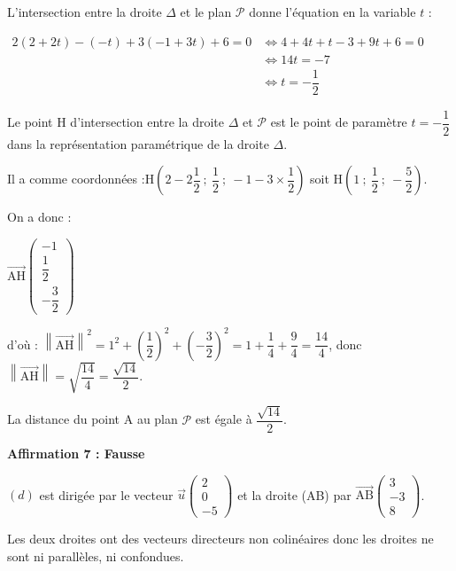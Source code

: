 \documentclass[10pt]{article}
\providecommand{\vect}[1]{\overrightarrow{#1}}
\begin{document}
L'intersection entre la droite $\Delta$ et le plan $\mathcal{P}$ donne l'équation en la variable $t$ :

$\begin{aligned} 2(2+2t)- (-t)+3(-1+3t)+6=0 &\iff 4+4t+t-3+9t+6=0\\
	& \iff 14t=-7\\
	& \iff t=-\dfrac{1}{2}
\end{aligned}$

Le point H d'intersection entre la droite $\Delta$ et $\mathcal{P}$ est le point de paramètre  $ t=-\dfrac{1}{2}$ dans la représentation paramétrique de la droite $\Delta$.

Il a comme coordonnées :\quad$\mathrm{H}\left(2 -2 \dfrac{1}{2}~;~\dfrac{1}{2}~;~-1 - 3 \times\dfrac{1}{2}\right)$ soit $\mathrm{H}\left(1~;~\dfrac{1}{2}~;~-\dfrac{5}{2}\right)$.

On a donc :

$\vect{\mathrm{AH}}\begin{pmatrix}-1\\ \dfrac{1}{2}\\ -\dfrac{3}{2}\end{pmatrix}$

d'où : $\left\|\vect {\mathrm{AH}}\right\|^2=1^2+ \left(\dfrac{1}{2}\right)^2+\left(-\dfrac{3}{2}\right)^2=1+\dfrac{1}{4}+\dfrac{9}{4}=\dfrac{14}{4}$, donc $\left\|\vect {\mathrm{AH}}\right\|=\sqrt{\dfrac{14}{4}}=\dfrac{\sqrt{14}}{2}$.

La distance du point A au plan $\mathcal{P}$ est égale à $\dfrac{\sqrt{14}}{2}$.

\smallskip









\textbf{Affirmation 7 : Fausse}

$(d)$ est dirigée par le vecteur $\vect{u}\begin{pmatrix}2\\0\\-5\end{pmatrix}$ et la droite (AB) par $\vect{\mathrm{AB}}\begin{pmatrix}3 \\ -3\\8\end{pmatrix}$.

Les deux droites ont des vecteurs directeurs non colinéaires  donc les droites ne sont ni parallèles, ni confondues.
\end{document}
